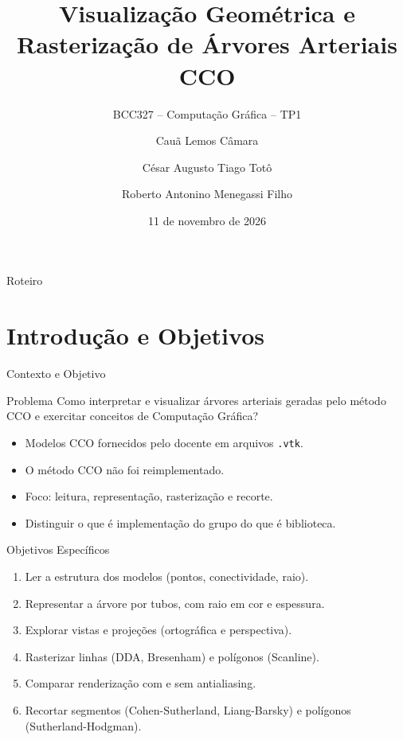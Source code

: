 \documentclass[aspectratio=169,11pt]{beamer}
\title[Visualização CCO -- Computação Gráfica]{Visualização Geométrica e Rasterização de Árvores Arteriais CCO}
\subtitle{BCC327 -- Computação Gráfica -- TP1}
\author{Cauã Lemos Câmara \and César Augusto Tiago Totô \and Roberto Antonino Menegassi Filho}
\institute[UFOP]{Departamento de Computação (DECOM)\\Universidade Federal de Ouro Preto (UFOP)}
\date{11 de novembro de 2026}
\begin{document}
\begin{frame}
  \titlepage
\end{frame}

\begin{frame}{Roteiro}
  \tableofcontents
\end{frame}

\section{Introdução e Objetivos}
\begin{frame}{Contexto e Objetivo}
\begin{block}{Problema}
Como interpretar e visualizar árvores arteriais geradas pelo método CCO e exercitar conceitos de Computação Gráfica?
\end{block}
\begin{itemize}
  \item Modelos CCO fornecidos pelo docente em arquivos \texttt{.vtk}.
  \item O método CCO \alert{não} foi reimplementado.
  \item Foco: leitura, representação, rasterização e recorte.
  \item Distinguir o que é \alert{implementação do grupo} do que é \alert{biblioteca}.
\end{itemize}
\end{frame}

\begin{frame}{Objetivos Específicos}
\begin{enumerate}
  \item Ler a estrutura dos modelos (pontos, conectividade, raio).
  \item Representar a árvore por tubos, com raio em cor e espessura.
  \item Explorar vistas e projeções (ortográfica e perspectiva).
  \item Rasterizar linhas (DDA, Bresenham) e polígonos (Scanline).
  \item Comparar renderização com e sem antialiasing.
  \item Recortar segmentos (Cohen-Sutherland, Liang-Barsky) e polígonos (Sutherland-Hodgman).
\end{enumerate}
\end{frame}

\end{document}
